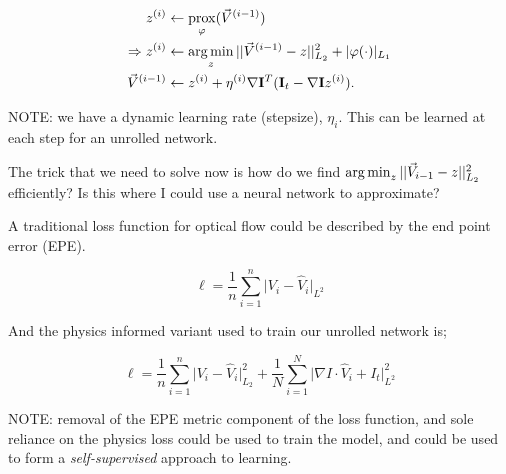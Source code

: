 \begin{align*}
    z^{(i)} &\leftarrow \operatorname*{\mathrm{prox}}_\varphi (\vec{V}^{(i-1)}) \\
    \Rightarrow z^{(i)} &\leftarrow \operatorname*{arg\,min}_{z} ||\vec{V}^{(i-1)} - z||^{2}_{L_2} + |\varphi(\cdot)|_{L_1}\\
    \vec{V}^{(i-1)} &\leftarrow z^{(i)} + \eta^{(i)} \nabla \mathbf{I}^{T} (\mathbf{I}_t - \nabla \mathbf{I} z^{(i)}).
\end{align*}

\color{red} NOTE: we have a dynamic learning rate (stepsize), $\eta_i$. This can be learned at each step for an unrolled network. \color{gray}

The trick that we need to solve now is how do we find $\operatorname*{arg\,min}_{z} ||\vec{V}_{i-1} - z||^{2}_{L_2}$ efficiently? Is this where I could use a neural network to approximate?

A traditional loss function for optical flow could be described by the end point error (EPE).

\begin{equation*}
\ell = \frac{1}{n} \sum_{i=1}^{n} \big|V_{i} - \hat{V}_{i} \big|_{L^2}
\end{equation*}

And the physics informed variant used to train our unrolled network is;

\begin{equation*}
\ell = \frac{1}{n} \sum_{i=1}^{n} \big|V_{i} - \hat{V}_{i} \big|^2_{L_2} + \frac{1}{N} \sum_{i=1}^{N} \big|\nabla I \cdot \hat{V}_{i} + I_t \big|^2_{L^2}
\end{equation*}

\color{red}
NOTE: removal of the EPE metric component of the loss function, and sole reliance on the physics loss could be used to train the model, and could be used to form a \textit{self-supervised} approach to learning.
\color{gray}

\color{black}
